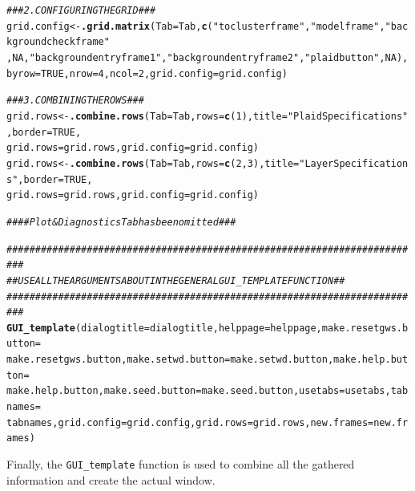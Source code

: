 \documentclass[a4paper]{article}\usepackage[]{graphicx}\usepackage[]{color}
\makeatletter
\newcommand{\hlnum}[1]{\textcolor[rgb]{0.686,0.059,0.569}{#1}}%
\newcommand{\hlstr}[1]{\textcolor[rgb]{0.192,0.494,0.8}{#1}}%
\newcommand{\hlcom}[1]{\textcolor[rgb]{0.678,0.584,0.686}{\textit{#1}}}%
\newcommand{\hlstd}[1]{\textcolor[rgb]{0.345,0.345,0.345}{#1}}%
\newcommand{\hlkwb}[1]{\textcolor[rgb]{0.69,0.353,0.396}{#1}}%
\newcommand{\hlkwc}[1]{\textcolor[rgb]{0.333,0.667,0.333}{#1}}%
\newcommand{\hlkwd}[1]{\textcolor[rgb]{0.737,0.353,0.396}{\textbf{#1}}}%
\newenvironment{kframe}{%
 \def\at@end@of@kframe{}%
 \ifinner\ifhmode%
  \def\at@end@of@kframe{\end{minipage}}%
  \begin{minipage}{\columnwidth}%
 \fi\fi%
 \def\FrameCommand##1{\hskip\@totalleftmargin \hskip-\fboxsep
 \colorbox{shadecolor}{##1}\hskip-\fboxsep
     \hskip-\linewidth \hskip-\@totalleftmargin \hskip\columnwidth}%
 \MakeFramed {\advance\hsize-\width
   \@totalleftmargin\z@ \linewidth\hsize
   \@setminipage}}%
 {\par\unskip\endMakeFramed%
 \at@end@of@kframe}
\newenvironment{knitrout}{}{} %
\makeatother
\begin{document}
\begin{knitrout}
\color{fgcolor}\begin{kframe}
\begin{alltt}
\hlcom{### 2. CONFIGURING THE GRID ###}
\hlstd{grid.config} \hlkwb{<-} \hlkwd{.grid.matrix}\hlstd{(}\hlkwc{Tab}\hlstd{=Tab,}\hlkwd{c}\hlstd{(}\hlstr{"toclusterframe"}\hlstd{,}\hlstr{"modelframe"}\hlstd{,}\hlstr{"backgroundcheckframe"}
                \hlstd{,}\hlnum{NA}\hlstd{,}\hlstr{"backgroundentryframe1"}\hlstd{,}\hlstr{"backgroundentryframe2"}\hlstd{,}\hlstr{"plaidbutton"}\hlstd{,}\hlnum{NA}\hlstd{),}
                \hlkwc{byrow}\hlstd{=}\hlnum{TRUE}\hlstd{,}\hlkwc{nrow}\hlstd{=}\hlnum{4}\hlstd{,}\hlkwc{ncol}\hlstd{=}\hlnum{2}\hlstd{,}\hlkwc{grid.config}\hlstd{=grid.config)}


\hlcom{### 3. COMBINING THE ROWS ###}
\hlstd{grid.rows} \hlkwb{<-} \hlkwd{.combine.rows}\hlstd{(}\hlkwc{Tab}\hlstd{=Tab,}\hlkwc{rows}\hlstd{=}\hlkwd{c}\hlstd{(}\hlnum{1}\hlstd{),}\hlkwc{title}\hlstd{=}\hlstr{"Plaid Specifications"}\hlstd{,}\hlkwc{border}\hlstd{=}\hlnum{TRUE}\hlstd{,}
                \hlkwc{grid.rows}\hlstd{=grid.rows,}\hlkwc{grid.config}\hlstd{=grid.config)}
\hlstd{grid.rows} \hlkwb{<-} \hlkwd{.combine.rows}\hlstd{(}\hlkwc{Tab}\hlstd{=Tab,}\hlkwc{rows}\hlstd{=}\hlkwd{c}\hlstd{(}\hlnum{2}\hlstd{,}\hlnum{3}\hlstd{),}\hlkwc{title}\hlstd{=}\hlstr{"Layer Specifications"}\hlstd{,}\hlkwc{border}\hlstd{=}\hlnum{TRUE}\hlstd{,}
                \hlkwc{grid.rows}\hlstd{=grid.rows,}\hlkwc{grid.config}\hlstd{=grid.config)}


\hlcom{#### Plot & Diagnostics Tab has been omitted ###}


\hlcom{#########################################################################}
\hlcom{## USE ALL THE ARGUMENTS ABOUT IN THE GENERAL GUI_TEMPLATE FUNCTION    ##}
\hlcom{#########################################################################}
\hlkwd{GUI_template}\hlstd{(}\hlkwc{dialogtitle}\hlstd{=dialogtitle,}\hlkwc{helppage}\hlstd{=helppage,}\hlkwc{make.resetgws.button}\hlstd{=}
        \hlstd{make.resetgws.button,}\hlkwc{make.setwd.button}\hlstd{=make.setwd.button,}\hlkwc{make.help.button}\hlstd{=}
        \hlstd{make.help.button,}\hlkwc{make.seed.button}\hlstd{=make.seed.button,}\hlkwc{usetabs}\hlstd{=usetabs,}\hlkwc{tabnames}\hlstd{=}
        \hlstd{tabnames,}\hlkwc{grid.config}\hlstd{=grid.config,}\hlkwc{grid.rows}\hlstd{=grid.rows,}\hlkwc{new.frames}\hlstd{=new.frames)}
\end{alltt}
\end{kframe}
\end{knitrout}
\noindent Finally, the \verb|GUI_template| function is used to combine all the
gathered information and create the actual window.
\end{document}
